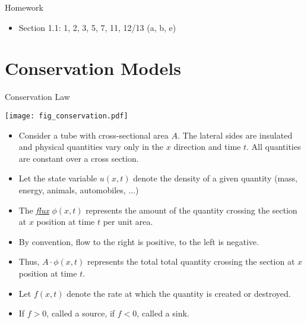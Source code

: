 \documentclass[t,10pt,fleqn]{beamer}
\newcommand{\tu}[1]{\underline{\textit{#1}}}
\begin{document}
 \begin{frame}{Homework}
    \begin{itemize} 
             \item  Section 1.1: 1, 2, 3, 5, 7, 11, 12/13 (a, b, e)
    \end{itemize}
 
 \end{frame}

\section{Conservation Models}
 \begin{frame}{Conservation Law}
\begin{center}
\vspace{-3.2cm}
\texttt{[image: fig\_conservation.pdf]}
\end{center}
 \vspace{-2.5cm}
 \begin{itemize}
     \pause
     \item Consider a tube with cross-sectional area $A$.  The lateral sides are insulated and physical quantities vary only in the $x$ direction and time $t$.  All quantities are constant over a cross section.  
     \pause
     \item Let the state variable $u(x,t)$ denote the density of a given quantity (mass, energy, animals, automobiles, $\ldots$)
          \pause
     \item The \tu{flux} $\phi(x,t)$ represents the amount of the quantity crossing the section at $x$ position at time $t$ per unit area.
     \pause
     \item By convention, flow to the right is positive, to the left is negative.  
     \pause
     \item Thus, $A \cdot \phi(x,t)$ represents the total total quantity crossing the section at $x$ position at time $t$.
     \pause
     \item  Let $f(x,t)$ denote the rate at which the quantity is created or destroyed.  
          \pause
     \item  If $f > 0$, called a source, if $f < 0$, called a sink.
 \end{itemize}
 
 \end{frame}
\end{document}
